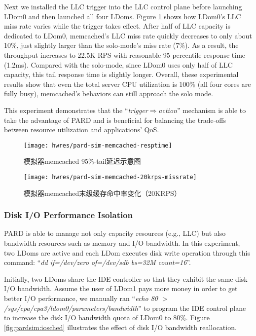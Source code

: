 Next we installed the LLC trigger into the LLC control plane before launching
LDom0 and then launched all four LDoms. Figure \ref{fig:pardsim:memcached-20krps-missrate} shows how
LDom0's LLC miss rate varies while the trigger takes effect. After half of LLC capacity is
dedicated to LDom0, memcached's LLC miss rate quickly decreases to
only about 10\%, just slightly larger than the solo-mode's miss rate (7\%).
As a result, the throughput increases to 22.5K RPS with reasonable
95-percentile response time (1.2ms). Compared with the solo-mode, 
since LDom0 uses only half of LLC capacity, this tail response time is 
slightly longer. Overall, these experimental results show that even the total 
server CPU utilization is 100\% (all four cores are fully busy),
memcached's behaviors can still approach the solo mode.

This experiment demonstrates that the ``\emph{trigger$\Rightarrow$action}'' mechanism 
is able to take the advantage of PARD and is beneficial for balancing the trade-offs between
resource utilization and applications' QoS.

\begin{figure}[tb]
\begin{minipage}{0.48\textwidth}
  \centering
  \texttt{[image: hwres/pard-sim-memcached-resptime]}
  \caption{模拟器memcached 95\%-tail延迟示意图}
  \label{fig:pardsim:memcached-resptime}
\end{minipage}\hfill
\begin{minipage}{0.48\textwidth}
  \centering
  \texttt{[image: hwres/pard-sim-memcached-20krps-missrate]}
  \caption{模拟器memcached末级缓存命中率变化（20KRPS）}
  \label{fig:pardsim:memcached-20krps-missrate}
\end{minipage}
\end{figure}

\subsubsection{Disk I/O Performance Isolation}

PARD is able to manage not only capacity resources (e.g., LLC)
but also bandwidth resources such as memory and I/O bandwidth.
In this experiment, two LDoms are active and each LDom executes
disk write operation through
this command: ``\emph{dd if=/dev/zero of=/dev/sdb bs=32M count=16}''.

Initially, two LDoms share the IDE controller so that they exhibit the same
disk I/O bandwidth. Assume the user of LDom1 pays more money in order to get
better I/O performance, we manually ran
``\emph{echo 80 $>$ /sys/cpa/cpa3/ldom0/parameters/bandwidth}''
to program the IDE control plane
to increase the disk I/O bandwidth quota of LDom0 to 80\%.
Figure \ref{fig:pardsim:iosched} illustrates the effect of disk I/O
bandwidth reallocation.

